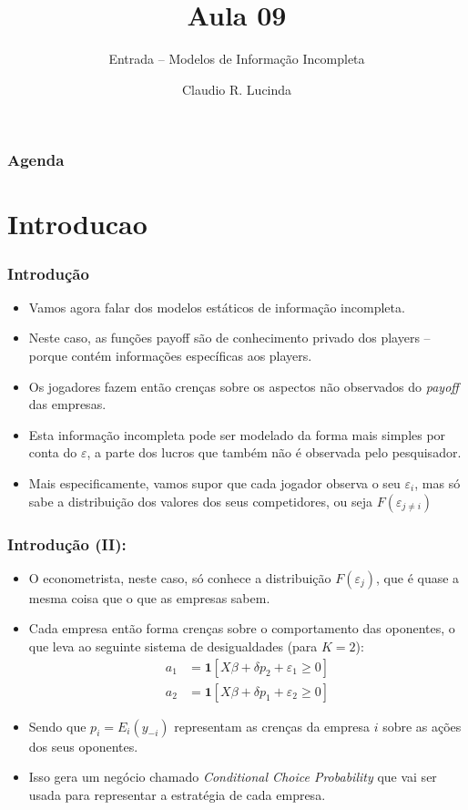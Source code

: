 \documentclass{beamer}
\title{Aula 09}
\subtitle{Entrada -- Modelos de Informação Incompleta}
\author{Claudio R. Lucinda}
\institute{FEA-RP/USP}
\date{}
\begin{document}
\frame{\titlepage}
\begin{frame}\frametitle{Agenda}
  \tableofcontents[pausesections]
\end{frame}

\section{Introducao}

\begin{frame}[fragile]\frametitle{Introdução}
    \begin{itemize}
    	\item Vamos agora falar dos modelos estáticos de informação incompleta.
    	\item Neste caso, as funções payoff são de conhecimento privado dos players -- porque contém informações específicas aos players.
    	\item Os jogadores fazem então crenças sobre os aspectos não observados do \textit{payoff} das empresas.
    	\item Esta informação incompleta pode ser modelado da forma mais simples por conta do $\varepsilon$, a parte dos lucros que também não é observada pelo pesquisador. 
    	\item Mais especificamente, vamos supor que cada jogador observa o seu $\varepsilon_{i}$, mas só sabe a distribuição dos valores dos seus competidores, ou seja $F(\varepsilon_{j\neq i})$
    \end{itemize}


\end{frame}

\begin{frame}[fragile]\frametitle{Introdução (II):}
\begin{itemize}
	\item O econometrista, neste caso, só conhece a distribuição $F(\varepsilon_{j})$, que é quase a mesma coisa que o que as empresas sabem.
	\item Cada empresa então forma crenças sobre o comportamento das oponentes, o que leva ao seguinte sistema de desigualdades (para $K=2$):
\begin{align*}
	a_{1}&=\mathbf{1}\left[X\beta +\delta p_{2} + \varepsilon_{1} \geq 0 \right]\\
	a_{2}&=\mathbf{1}\left[X\beta +\delta p_{1} + \varepsilon_{2} \geq 0 \right]
\end{align*}
	\item Sendo que $p_{i}=E_{i}(y_{-i})$ representam as crenças da empresa $i$ sobre as ações dos seus oponentes.
	\item Isso gera um negócio chamado \textit{Conditional Choice Probability} que vai ser usada para representar a estratégia de cada empresa.
\end{itemize}
    
\end{frame}
\end{document}
